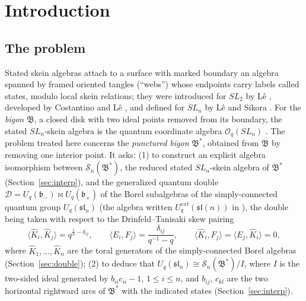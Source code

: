\documentclass[11pt]{article}
\theoremstyle{remark}
\newcommand{\U}{U_q}
\newcommand{\slN}{\mathfrak{sl}_n}
\newcommand{\bp}{\mathfrak b_+}
\newcommand{\bm}{\mathfrak b_-}
\newcommand{\redS}{\overline{\mathcal S}_n}
\newcommand{\Bstar}{\mathfrak B^*}
\newcommand{\Bigon}{\mathfrak B}
\newcommand{\la}{\langle}
\newcommand{\ra}{\rangle}
\newcommand{\cD}{\mathcal D}
\newcommand{\Oq}{\mathcal O_q(SL_n)}
\begin{document}
\begin{abstract}
We construct an explicit algebra isomorphism between the generalized
quantum double $\cD=\U(\bm)\bowtie\U(\bp)$ of the Borel subalgebras of
the simply-connected $\U(\slN)$, for the Drinfeld--Tanisaki skew
pairing, and the reduced stated $SL_n$-skein algebra $\redS(\Bstar)$ of
a bigon with one interior puncture: the two families of horizontal arcs
of $\Bstar$ become a lower and an upper triangular quantum matrix, whose
diagonal entries generate the two copies of the weight torus and whose
off-diagonal entries are root vectors up to toral factors. We deduce
that $\U(\slN)$ is the quotient of $\redS(\Bstar)$ by the relations
$b_{aa}c_{aa}=1$ between the diagonal entries.
For $n=2$ both statements are due to Korinman. The proof combines the
L\^e--Sikora factorization of stated skein algebras with the
Faddeev--Reshetikhin--Takhtajan realization of quantum Borel algebras
by triangular quantum matrices, with all normalizations made explicit.
\end{abstract}

\section{Introduction}

\subsection{The problem}

Stated skein algebras attach to a surface with marked boundary an
algebra spanned by framed oriented tangles (``webs'') whose endpoints
carry labels called states, modulo local skein relations; they were
introduced for $SL_2$ by L\^e \cite{Le}, developed by Costantino and
L\^e \cite{CL}, and defined for $SL_n$ by L\^e and Sikora \cite{LS}. For the \emph{bigon} $\Bigon$, a closed disk
with two ideal points removed from its boundary, the stated
$SL_n$-skein algebra is the quantum coordinate algebra $\Oq$
\cite[Theorem 6.3]{LS}. The problem treated here concerns the
\emph{punctured bigon} $\Bstar$, obtained from $\Bigon$ by removing one
interior point. It asks:
(1) to construct an explicit algebra isomorphism between
$\redS(\Bstar)$, the reduced stated $SL_n$-skein algebra of $\Bstar$
(Section~\ref{sec:interp}), and the generalized quantum double $\cD=\U(\bm)\bowtie\U(\bp)$ of the
Borel subalgebras of the simply-connected quantum group $\U(\slN)$
(the algebra written $U^{ext}_q(\mathfrak{sl}(n))$ in
\cite[Section 8.5.3]{KS}), the double being taken with respect to the
Drinfeld--Tanisaki skew pairing
\begin{equation}\label{eq:problempairing}
 \la\hat K_i,\hat K_j\ra=q^{\frac1n-\delta_{ij}},\qquad
 \la E_i,F_j\ra=\frac{\delta_{ij}}{q^{-1}-q},\qquad
 \la\hat K_i,F_j\ra=\la E_j,\hat K_i\ra=0 ,
\end{equation}
where $\hat K_1,\dots,\hat K_n$ are the toral generators of the
simply-connected Borel algebras (Section~\ref{sec:double});
(2) to deduce that $\U(\slN)\cong\redS(\Bstar)/I$, where $I$ is
the two-sided ideal generated by $b_{ii}c_{ii}-1$, $1\le i\le n$, and
$b_{ij}$, $c_{kl}$ are the two horizontal rightward arcs of $\Bstar$
with the indicated states (Section~\ref{sec:interp}).
\end{document}
